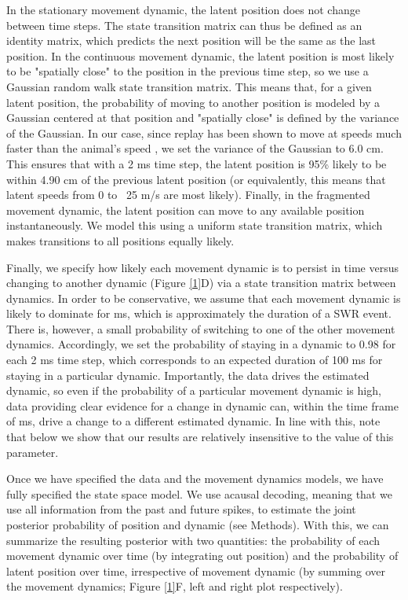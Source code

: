 \documentclass[times, twoside]{zHenriquesLab-StyleBioRxiv}
\begin{document}
In the stationary movement dynamic, the latent position does not change between time steps. The state transition matrix can thus be defined as an identity matrix, which predicts the next position will be the same as the last position. In the continuous movement dynamic, the latent position is most likely to be  "spatially close" to the position in the previous time step, so we use a Gaussian random walk state transition matrix. This means that, for a given latent position, the probability of moving to another position is modeled by a Gaussian centered at that position and "spatially close" is defined by the variance of the Gaussian. In our case, since replay has been shown to move at speeds much faster than the animal's speed \cite{DavidsonHippocampalReplayExtended2009, PfeifferAutoassociativedynamicsgeneration2015}, we set the variance of the Gaussian to 6.0 cm. This ensures that with a 2 ms time step, the latent position is 95\% likely to be within 4.90 cm of the previous latent position (or equivalently, this means that latent speeds from 0 to ~25 m/s are most likely).  Finally, in the fragmented movement dynamic, the latent position can move to any available position instantaneously. We model this using a uniform state transition matrix, which makes transitions to all positions equally likely.

Finally, we specify how likely each movement dynamic is to persist in time versus changing to another dynamic (Figure \ref{1}D) via a state transition matrix between dynamics. In order to be conservative, we assume that each movement dynamic is likely to dominate for  ms, which is approximately the duration of a SWR event. There is, however, a small probability of switching to one of the other movement dynamics. Accordingly, we set the probability of staying in a dynamic to 0.98 for each 2 ms time step, which corresponds to an expected duration of 100 ms for staying in a particular dynamic. Importantly, the data drives the estimated dynamic, so even if the probability of a particular movement dynamic is high, data providing clear evidence for a change in dynamic can, within the time frame of  ms, drive a change to a different estimated dynamic. In line with this, note that below we show that our results are relatively insensitive to the value of this parameter.

Once we have specified the data and the movement dynamics models, we have fully specified the state space model. We use acausal decoding, meaning that we use all information from the past and future spikes, to estimate the joint posterior probability of position and dynamic (see Methods). With this, we can summarize the resulting posterior with two quantities: the probability of each movement dynamic over time (by integrating out position) and the probability of latent position over time, irrespective of movement dynamic (by summing over the movement dynamics; Figure \ref{1}F, left and right plot respectively). 
\end{document}
